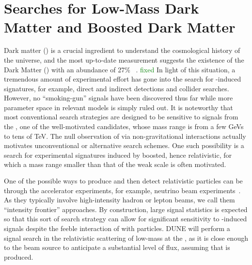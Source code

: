 \section{Searches for Low-Mass  Dark Matter and Boosted Dark Matter}
Dark matter () is a crucial ingredient to understand the cosmological history of the universe, and the most up-to-date measurement suggests the existence of the Dark Matter
() with an abundance of 27\% ~\cite{Aghanim:2018eyx}. 
\textcolor{green}{fixed}
In light of this situation, a tremendous amount of experimental effort has gone into %
the search for -induced signatures, for example,  direct and indirect detections and collider searches. However, no ``smoking-gun'' signals have been discovered thus far while more parameter space in relevant  models is simply ruled out. %
It is noteworthy that most conventional  search strategies are designed to be sensitive to signals from the , one of the well-motivated  candidates, whose mass range is from a few GeVs to tens of TeV. 
The null observation of  via non-gravitational interactions actually motivates unconventional or alternative  search schemes. 
One such possibility is %
a search for experimental signatures induced by boosted, hence relativistic,  for which %
a mass range smaller than that of the weak scale is often motivated. 

One of the possible ways to produce and then detect relativistic  particles can be through the accelerator experiments, 
for example, neutrino beam experiments~\cite{Alexander:2016aln, Battaglieri:2017aum, LoSecco:1980nf, Acciarri:2015uup}. 
As they typically involve high-intensity hadron or lepton beams, we %
call them ``intensity frontier'' approaches. 
By construction, large signal statistics is expected so that this sort of search strategy can allow for significant
 sensitivity to -induced signals despite the feeble interaction of  with  particles. %
DUNE will perform a signal search in the relativistic scattering of low-mass  at the , as it is close enough to the beam source to  anticipate a substantial 
 level of  flux, assuming that  is produced. 

